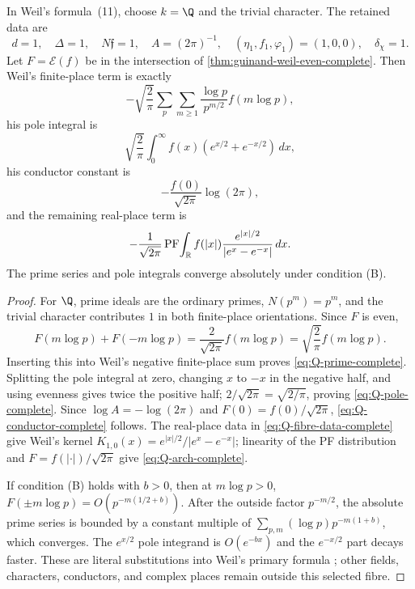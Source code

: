\begin{theorem}[Termwise $k=\Q$, $\chi=1$ specialization]
\label{thm:weil-Q-specialization-complete}
In Weil's formula~(11), choose $k=\Q$ and the trivial character.  The retained
data are
\begin{equation}
 d=1,\quad\Delta=1,\quad N\mathfrak f=1,\quad A=(2\pi)^{-1},\quad
 (\eta_1,f_1,\varphi_1)=(1,0,0),\quad\delta_\chi=1.
 \label{eq:Q-fibre-data-complete}
\end{equation}
Let $F=\mathcal E(f)$ be in the intersection of
\cref{thm:guinand-weil-even-complete}.  Then Weil's finite-place term is
exactly
\begin{equation}
 -\sqrt{\frac2\pi}\sum_p\sum_{m\geq1}
 \frac{\log p}{p^{m/2}}f(m\log p),
 \label{eq:Q-prime-complete}
\end{equation}
his pole integral is
\begin{equation}
 \sqrt{\frac2\pi}\int_0^\infty
 f(x)(e^{x/2}+e^{-x/2})\,dx,
 \label{eq:Q-pole-complete}
\end{equation}
his conductor constant is
\begin{equation}
 -\frac{f(0)}{\sqrt{2\pi}}\log(2\pi),
 \label{eq:Q-conductor-complete}
\end{equation}
and the remaining real-place term is
\begin{equation}
 -\frac1{\sqrt{2\pi}}\operatorname{PF}\!\int_\mathbb R
 f(|x|)\frac{e^{|x|/2}}{|e^x-e^{-x}|}\,dx.
 \label{eq:Q-arch-complete}
\end{equation}
The prime series and pole integrals converge absolutely under condition (B).
\end{theorem}

\begin{proof}
For $\Q$, prime ideals are the ordinary primes, $N(p^m)=p^m$, and the
trivial character contributes $1$ in both finite-place orientations.  Since
$F$ is even,
\[
 F(m\log p)+F(-m\log p)
 =\frac{2}{\sqrt{2\pi}}f(m\log p)
 =\sqrt{\frac2\pi}f(m\log p).
\]
Inserting this into Weil's negative finite-place sum proves
\eqref{eq:Q-prime-complete}.  Splitting the pole integral at zero, changing
$x$ to $-x$ in the negative half, and using evenness gives twice the positive
half; $2/\sqrt{2\pi}=\sqrt{2/\pi}$, proving
\eqref{eq:Q-pole-complete}.  Since $\log A=-\log(2\pi)$ and
$F(0)=f(0)/\sqrt{2\pi}$, \eqref{eq:Q-conductor-complete} follows.
The real-place data in \eqref{eq:Q-fibre-data-complete} give Weil's kernel
$K_{1,0}(x)=e^{|x|/2}/|e^x-e^{-x}|$; linearity of the PF distribution and
$F=f(|\cdot|)/\sqrt{2\pi}$ give \eqref{eq:Q-arch-complete}.

If condition (B) holds with $b>0$, then at $m\log p>0$,
$F(\pm m\log p)=O(p^{-m(1/2+b)})$.  After the outside factor $p^{-m/2}$,
the absolute prime series is bounded by a constant multiple of
$\sum_{p,m}(\log p)p^{-m(1+b)}$, which converges.  The $e^{x/2}$ pole
integrand is $O(e^{-bx})$ and the $e^{-x/2}$ part decays faster.  These are
literal substitutions into Weil's primary formula
\cite[Collected Papers II, pp.~57--58, eq.~(11)]{weil1952}; other fields,
characters, conductors, and complex places remain outside this selected
fibre.
\end{proof}

